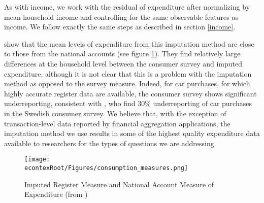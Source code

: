 \documentclass[titlepage]{\econtex}\newcommand{\texname}{ConsumptionHeterogeneity}
\begin{document}
	As with income, we work with the residual of expenditure after normalizing by mean household income and controlling for the same observable features as income. We follow exactly the same steps as described in section \ref{income}.
	
	\cite{abildgren_consistency_2018} show that the mean levels of expenditure from this imputation method are close to those from the national accounts (see figure \ref{fig:ConsumptionMeasures}). They find relatively large differences at the household level between the consumer survey and imputed expenditure, although it is not clear that this is a problem with the imputation method as opposed to the survey measure. Indeed, for car purchases, for which highly accurate register data are available, the consumer survey shows significant underreporting, consistent with \cite{koijen_judging_2014}, who find 30\% underreporting of car purchases in the Swedish consumer survey. We believe that, with the exception of transaction-level data reported by financial aggregation applications, the imputation method we use results in some of the highest quality expenditure data available to researchers for the types of questions we are addressing.
	\begin{figure} 
		\begin{centering}
			\texttt{[image: \\econtexRoot/Figures/consumption\_measures.png]} 
			\caption{Imputed Register Measure and National Account Measure of Expenditure (from \cite{abildgren_consistency_2018})}
			\label{fig:ConsumptionMeasures}
		\end{centering}
	\end{figure}
	
\end{document}
